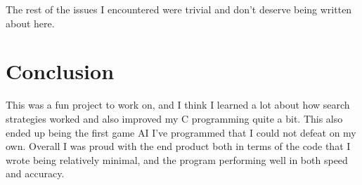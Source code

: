\documentclass{article}
\begin{document}
The rest of the issues I encountered were trivial and don't deserve being written about here.
\section{Conclusion}
This was a fun project to work on, and I think I learned a lot about how search strategies worked and also improved my C programming quite a bit. This also ended up being the first game AI I've programmed that I could not defeat on my own. Overall I was proud with the end product both in terms of the code that I wrote being relatively minimal, and the program performing well in both speed and accuracy.
\end{document}
